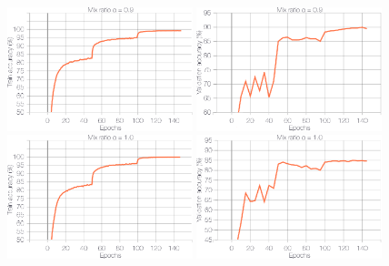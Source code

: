 \begin{figure}[htb]
    \vspace{10pt}
    \includegraphics[width=0.48\textwidth]{figs/acc_loss_mix/mix0.9/nat_train_top1.eps}
    \hspace{10pt}
    \includegraphics[width=0.48\textwidth]{figs/acc_loss_mix/mix0.9/nat_val_top1.eps}\\
    \vspace{10pt}
    \includegraphics[width=0.48\textwidth]{figs/acc_loss_mix/mix1.0/nat_train_top1.eps}
    \hspace{10pt}
    \includegraphics[width=0.48\textwidth]{figs/acc_loss_mix/mix1.0/nat_val_top1.eps}\\
\end{figure}

